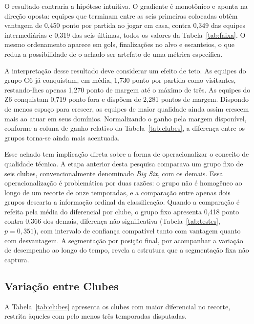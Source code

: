 O resultado contraria a hipótese intuitiva. O gradiente é monotônico e aponta na
direção oposta: equipes que terminam entre as seis primeiras colocadas obtêm
vantagem de 0,450 ponto por partida ao jogar em casa, contra 0,349 das equipes
intermediárias e 0,319 das seis últimas, todos os valores da
Tabela~\ref{tab:faixa}. O mesmo ordenamento aparece em gols,
finalizações no alvo e escanteios, o que reduz a possibilidade de o achado ser
artefato de uma métrica específica.

A interpretação desse resultado deve considerar um efeito de teto. As equipes do
grupo G6 já conquistam, em média, 1,730 ponto por partida como visitantes,
restando-lhes apenas 1,270 ponto de margem até o máximo de três. As equipes do
Z6 conquistam 0,719 ponto fora e dispõem de 2,281 pontos de margem. Dispondo de
menos espaço para crescer, as equipes de maior qualidade ainda assim crescem
mais ao atuar em seus domínios. Normalizando o ganho pela margem disponível,
conforme a coluna de ganho relativo da Tabela~\ref{tab:clubes}, a diferença
entre os grupos torna-se ainda mais acentuada.

Esse achado tem implicação direta sobre a forma de operacionalizar o conceito de
qualidade técnica. A etapa anterior desta pesquisa comparava um grupo fixo de
seis clubes, convencionalmente denominado \textit{Big Six}, com os demais. Essa
operacionalização é problemática por duas razões: o grupo não é homogêneo ao
longo de um recorte de onze temporadas, e a comparação entre apenas dois grupos
descarta a informação ordinal da classificação. Quando a comparação é refeita
pela média do diferencial por clube, o grupo fixo apresenta 0,418 ponto contra
0,366 dos demais, diferença não significativa (Tabela~\ref{tab:testes},
$p = 0{,}351$), com intervalo de confiança compatível tanto com vantagem quanto
com desvantagem. A segmentação por posição final, por acompanhar a variação de
desempenho ao longo do tempo, revela a estrutura que a segmentação fixa não
captura.

\subsection{Variação entre Clubes}\label{sec:res-clubes}

A Tabela~\ref{tab:clubes} apresenta os clubes com maior diferencial no recorte,
restrita àqueles com pelo menos três temporadas disputadas.

\begin{table}[htb]
  \centering
  \caption{Clubes com maior diferencial casa--fora (mínimo de três temporadas).}
  \label{tab:clubes}
  \resizebox{\textwidth}{!}{}
\end{table}

